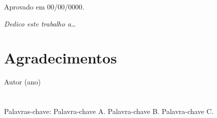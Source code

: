 \documentclass{abntexto}
\def\Direita{\noindent\hfill}
\begin{document}
{\parindent=1.5cm Aprovado em 00/00/0000.\par}
\Enter

\Enter
{}\Enter
{}
\newpage\null\newpage


\leavevmode\vfill

\Direita
\begin{minipage}{5cm}
    \itshape Dedico este trabalho a\dots
\end{minipage}
\newpage\null\newpage


\nonum\notoc\section{Agradecimentos}
{\parindent=1.5cm\lipsum[1]\par}
\newpage\null\newpage


\leavevmode\vfil

\Direita
\begin{minipage}{3cm}
    \linebreak
    Autor (ano)
\end{minipage}
\newpage\null\newpage


\nonum\notoc\section{\abstractname}
\noindent \lipsum[1]\Enter

Palavras-chave: Palavra-chave A. Palavra-chave B. Palavra-chave C.
\newpage\null\newpage


{\nonum\notoc\section{\abstractname}}
{\noindent \lipsum[1]\Enter}
\end{document}
